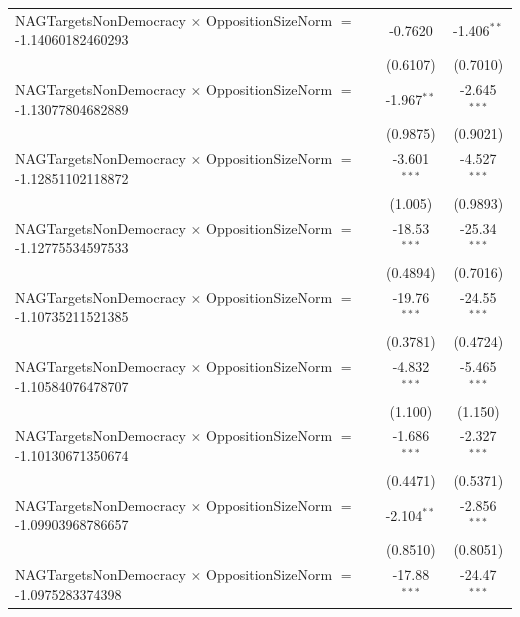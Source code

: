 \begin{tabular}{lcc}
   NAGTargetsNonDemocracy $\times$ OppositionSizeNorm $=$ -1.14060182460293     & -0.7620              & -1.406$^{**}$\\   
                                                                                & (0.6107)             & (0.7010)\\   
   NAGTargetsNonDemocracy $\times$ OppositionSizeNorm $=$ -1.13077804682889     & -1.967$^{**}$        & -2.645$^{***}$\\   
                                                                                & (0.9875)             & (0.9021)\\   
   NAGTargetsNonDemocracy $\times$ OppositionSizeNorm $=$ -1.12851102118872     & -3.601$^{***}$       & -4.527$^{***}$\\   
                                                                                & (1.005)              & (0.9893)\\   
   NAGTargetsNonDemocracy $\times$ OppositionSizeNorm $=$ -1.12775534597533     & -18.53$^{***}$       & -25.34$^{***}$\\   
                                                                                & (0.4894)             & (0.7016)\\   
   NAGTargetsNonDemocracy $\times$ OppositionSizeNorm $=$ -1.10735211521385     & -19.76$^{***}$       & -24.55$^{***}$\\   
                                                                                & (0.3781)             & (0.4724)\\   
   NAGTargetsNonDemocracy $\times$ OppositionSizeNorm $=$ -1.10584076478707     & -4.832$^{***}$       & -5.465$^{***}$\\   
                                                                                & (1.100)              & (1.150)\\   
   NAGTargetsNonDemocracy $\times$ OppositionSizeNorm $=$ -1.10130671350674     & -1.686$^{***}$       & -2.327$^{***}$\\   
                                                                                & (0.4471)             & (0.5371)\\   
   NAGTargetsNonDemocracy $\times$ OppositionSizeNorm $=$ -1.09903968786657     & -2.104$^{**}$        & -2.856$^{***}$\\   
                                                                                & (0.8510)             & (0.8051)\\   
   NAGTargetsNonDemocracy $\times$ OppositionSizeNorm $=$ -1.0975283374398      & -17.88$^{***}$       & -24.47$^{***}$\\   

\end{tabular}
